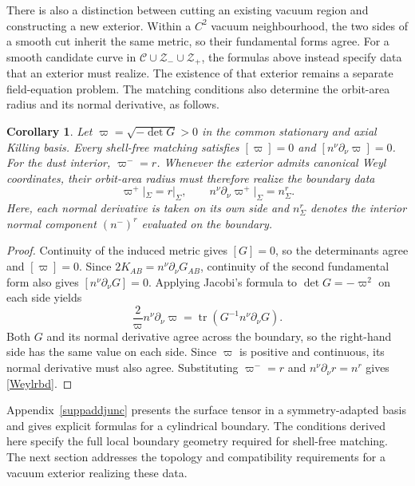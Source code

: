 \documentclass[amsmath,amsfonts,amssymb,aps,pra,superscriptaddress,10pt]{revtex4-2}
\numberwithin{equation}{section}
\theoremstyle{plain}
\newtheorem{corollary}{Corollary}
\theoremstyle{definition}
\theoremstyle{remark}
\theoremstyle{definition}
\begin{document}
There is also a distinction between cutting an existing vacuum region and constructing a new exterior. Within a $C^2$ vacuum neighbourhood, the two sides of a smooth cut inherit the same metric, so their fundamental forms agree. For a smooth candidate curve in $\mathcal{C}\cup\mathcal{Z}_-\cup\mathcal{Z}_+$, the formulas above instead specify data that an exterior must realize. The existence of that exterior remains a separate field-equation problem. The matching conditions also determine the orbit-area radius and its normal derivative, as follows.

\begin{corollary}
Let $\varpi=\sqrt{-\det G}>0$ in the common stationary and axial Killing basis. Every shell-free matching satisfies $[\varpi]=0$ and $[n^\nu\partial_\nu\varpi]=0$. For the dust interior, $\varpi^-=r$. Whenever the exterior admits canonical Weyl coordinates, their orbit-area radius must therefore realize the boundary data
\begin{equation}\label{Weylrbd}
\varpi^+|_\Sigma=r|_\Sigma,\qquad
n^\nu\partial_\nu\varpi^+|_\Sigma=n^r_\Sigma.
\end{equation}
Here, each normal derivative is taken on its own side and $n^r_\Sigma$ denotes the interior normal component $(n^-)^r$ evaluated on the boundary.
\end{corollary}

\begin{proof}
Continuity of the induced metric gives $[G]=0$, so the determinants agree and $[\varpi]=0$. Since $2K_{AB}=n^\nu\partial_\nu G_{AB}$, continuity of the second fundamental form also gives $[n^\nu\partial_\nu G]=0$. Applying Jacobi's formula to $\det G=-\varpi^2$ on each side yields
\begin{equation}
\frac{2}{\varpi}n^\nu\partial_\nu\varpi
=\operatorname{tr}\left(G^{-1}n^\nu\partial_\nu G\right).
\end{equation}
Both $G$ and its normal derivative agree across the boundary, so the right-hand side has the same value on each side. Since $\varpi$ is positive and continuous, its normal derivative must also agree. Substituting $\varpi^-=r$ and $n^\nu\partial_\nu r=n^r$ gives \eqref{Weylrbd}.
\end{proof}

Appendix~\ref{suppaddjunc} presents the surface tensor in a symmetry-adapted basis and gives explicit formulas for a cylindrical boundary. The conditions derived here specify the full local boundary geometry required for shell-free matching. The next section addresses the topology and compatibility requirements for a vacuum exterior realizing these data.
\end{document}
